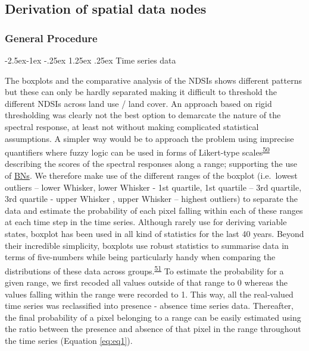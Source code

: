 \documentclass[12pt,oneside]{article}
\makeatletter
\renewcommand\paragraph{\@startsection{paragraph}{4}{\z@}%
            {-2.5ex\@plus -1ex \@minus -.25ex}%
            {1.25ex \@plus .25ex}%
            {\normalfont\normalsize\bfseries}}
\makeatother
\begin{document}
\hypertarget{I5}{%
\subsection{Derivation of spatial data nodes}\label{I5}}

\hypertarget{I51}{%
\subsubsection{General Procedure}\label{I51}}

\hypertarget{I511}{%
\paragraph{Time series data}\label{I511}}

The boxplots and the comparative analysis of the NDSIs shows different patterns but these can only be hardly separated making it difficult to threshold the different NDSIs across land use / land cover. An approach based on rigid thresholding was clearly not the best option to demarcate the nature of the spectral response, at least not without making complicated statistical assumptions. A simpler way would be to approach the problem using imprecise quantifiers where fuzzy logic can be used in forms of Likert-type scales\textsuperscript{\protect\hyperlink{ref-Likert_1932}{50}} describing the scores of the spectral responses along a range; supporting the use of \href{https://en.wikipedia.org/wiki/Bayesian_network}{BNs}. We therefore make use of the different ranges of the boxplot (i.e.~lowest outliers -- lower Whisker, lower Whisker - 1st quartile, 1st quartile -- 3rd quartile, 3rd quartile - upper Whisker , upper Whisker -- highest outliers) to separate the data and estimate the probability of each pixel falling within each of these ranges at each time step in the time series. Although rarely use for deriving variable states, boxplot has been used in all kind of statistics for the last 40 years. Beyond their incredible simplicity, boxplots use robust statistics to summarise data in terms of five-numbers while being particularly handy when comparing the distributions of these data across groups.\textsuperscript{\protect\hyperlink{ref-Wickham_and_Stryjewski_2012}{51}} To estimate the probability for a given range, we first recoded all values outside of that range to 0 whereas the values falling within the range were recorded to 1. This way, all the real-valued time series was reclassified into presence - absence time series data. Thereafter, the final probability of a pixel belonging to a range can be easily estimated using the ratio between the presence and absence of that pixel in the range throughout the time series (Equation \eqref{eq:eq1}).
\end{document}
